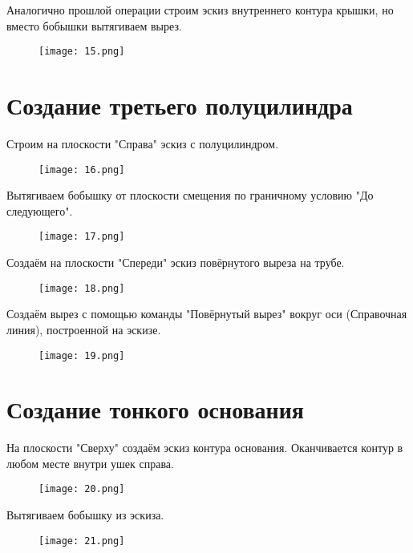 Аналогично прошлой операции строим эскиз внутреннего контура крышки, но вместо бобышки вытягиваем вырез. 
\FloatBarrier
\begin{figure}[ht]
    \centering
    \texttt{[image: 15.png]}
\end{figure}
\FloatBarrier

\section{Создание третьего полуцилиндра}
Строим на плоскости "Справа" эскиз с полуцилиндром. 
\FloatBarrier
\begin{figure}[ht]
    \centering
    \texttt{[image: 16.png]}
\end{figure}
\FloatBarrier

Вытягиваем бобышку от плоскости смещения по граничному условию "До следующего".
\FloatBarrier
\begin{figure}[ht]
    \centering
    \texttt{[image: 17.png]}
\end{figure}
\FloatBarrier

Создаём на плоскости "Спереди" эскиз повёрнутого выреза на трубе. 
\FloatBarrier
\begin{figure}[ht]
    \centering
    \texttt{[image: 18.png]}
\end{figure}
\FloatBarrier

Создаём вырез с помощью команды "Повёрнутый вырез" вокруг оси (Справочная линия), построенной на эскизе. 
\FloatBarrier
\begin{figure}[ht]
    \centering
    \texttt{[image: 19.png]}
\end{figure}
\FloatBarrier

\section{Создание тонкого основания}
На плоскости "Сверху" создаём эскиз контура основания. Оканчивается контур в любом месте внутри ушек справа.
\FloatBarrier
\begin{figure}[ht]
    \centering
    \texttt{[image: 20.png]}
\end{figure}
\FloatBarrier

Вытягиваем бобышку из эскиза. 
\FloatBarrier
\begin{figure}[ht]
    \centering
    \texttt{[image: 21.png]}
\end{figure}
\FloatBarrier

